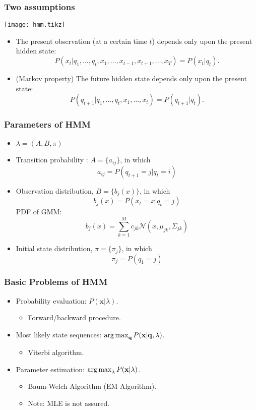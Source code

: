 \documentclass{beamer}
\begin{document}
\begin{frame}
  \frametitle{Two assumptions}

  \centering
  \texttt{[image: hmm.tikz]}

  \begin{itemize}
    \item The present observation (at a certain time $t$) depends only upon the present hidden state:
      \[
        P(x_t|q_1, \dots, q_t, x_1, \dots, x_{t-1},x_{t+1},\dots,x_T) = P(x_t|q_t) .
      \]
    \item (Markov property) The future hidden state depends only upon the present state:
      \[
        P(q_{t+1}|q_1, \dots, q_t, x_1, \dots, x_t) = P(q_{t+1}|q_t) .
      \]
  \end{itemize}
\end{frame}

\begin{frame}
  \frametitle{Parameters of HMM}

  \begin{itemize}
    \item $ \lambda = (A, B, \pi) $
    \item Transition probability : $A = \{a_{ij}\}$, in which 
      \[ a_{ij} = P(q_{t+1} = j | q_t = i) \]
    \item Observation distribution, $B = \{b_j(x)\}$, in which
      \[ b_j(x) = P(x_t = x | q_t = j) \]
      PDF of GMM:
      \[ b_j(x) = \sum_{k=1}^M c_{jk} \mathcal{N}(x, \mu_{jk}, \Sigma_{jk}) \]
    \item Initial state distribution, $\pi = \{\pi_j\}$, in which
      \[ \pi_j = P(q_1 = j) \]
  \end{itemize}
\end{frame}

\begin{frame}
  \frametitle{Basic Problems of HMM}

  \begin{itemize}
    \item Probability evaluation: $ P(\mathbf{x}|\lambda) $.
      \begin{itemize}
        \item Forward/backward procedure. 
      \end{itemize}

    \item Most likely state sequences: $ \operatorname*{arg\,max}_{\mathbf{q}} P(\mathbf{x}|\mathbf{q},\lambda) $.
      \begin{itemize}
        \item Viterbi algorithm.
      \end{itemize}

    \item Parameter estimation: $ \operatorname*{arg\,max}_{\lambda} P(\mathbf{x}|\lambda) $.
      \begin{itemize}
        \item Baum-Welch Algorithm (EM Algorithm).
        \item Note: MLE is not assured.
      \end{itemize}
  \end{itemize}
\end{frame}
\end{document}
